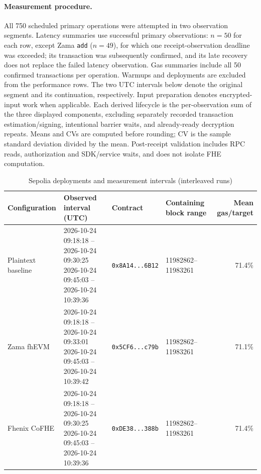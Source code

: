 \paragraph{Measurement procedure.}
All 750 scheduled primary operations were attempted in two observation segments.
Latency summaries use successful primary observations: $n=50$ for each row,
except Zama \texttt{add} ($n=49$), for which one receipt-observation deadline
was exceeded; its transaction was subsequently confirmed, and its late recovery
does not replace the failed latency observation. Gas summaries include all 50
confirmed transactions per operation. Warmups and deployments are excluded from
the performance rows. The two UTC intervals below denote the original segment
and its continuation, respectively.
Input preparation denotes encrypted-input work when applicable. Each derived
lifecycle is the per-observation sum of the three displayed components,
excluding separately recorded transaction estimation/signing, intentional
barrier waits, and already-ready decryption repeats. Means and CVs are computed
before rounding; CV is the sample standard deviation divided by the mean.
Post-receipt validation includes RPC reads, authorization and SDK/service waits,
and does not isolate FHE computation.
\begin{table}[!t]
\caption{Sepolia deployments and measurement intervals (interleaved runs)}
\label{tab:sepolia-experimental-deployments}
\centering
\footnotesize
\setlength{\tabcolsep}{4pt}
\begin{tabular}{|l|l|l|l|r|}
\hline
\textbf{Configuration} &
\textbf{Observed interval (UTC)} &
\textbf{Contract} &
\textbf{Containing block range} &
\textbf{Mean gas/target} \\
\hline

Plaintext baseline &
\shortstack[l]{2026-10-24 09:18:18 -- 2026-10-24 09:30:25 \\ 2026-10-24 09:45:03 -- 2026-10-24 10:39:36} &
\texttt{0x8A14...6B12} &
11982862--11983261 &
71.4\% \\
\hline
Zama fhEVM &
\shortstack[l]{2026-10-24 09:18:18 -- 2026-10-24 09:33:01 \\ 2026-10-24 09:45:03 -- 2026-10-24 10:39:42} &
\texttt{0x5CF6...c79b} &
11982862--11983261 &
71.1\% \\
\hline
Fhenix CoFHE &
\shortstack[l]{2026-10-24 09:18:18 -- 2026-10-24 09:30:25 \\ 2026-10-24 09:45:03 -- 2026-10-24 10:39:36} &
\texttt{0xDE38...388b} &
11982862--11983261 &
71.4\% \\
\hline
\end{tabular}
\end{table}

